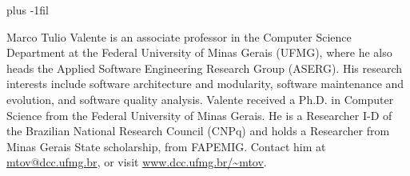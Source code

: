 \documentclass[10pt,journal,compsoc]{IEEEtran}
\begin{document}
\baselineskip plus -1fil

\begin{IEEEbiography}{Marco Tulio Valente}
is an associate professor in the Computer Science Department at the Federal University of Minas Gerais (UFMG), where he also heads the Applied Software Engineering Research Group (ASERG). His research interests include software architecture and modularity, software maintenance and evolution, and software quality analysis. Valente received a Ph.D. in Computer Science from the Federal University of Minas Gerais. He is a Researcher I-D of the Brazilian National Research Council (CNPq) and holds a Researcher from Minas Gerais State scholarship, from FAPEMIG. Contact him at \url{mtov@dcc.ufmg.br}, or visit \url{www.dcc.ufmg.br/~mtov}.
\end{IEEEbiography}









\end{document}
